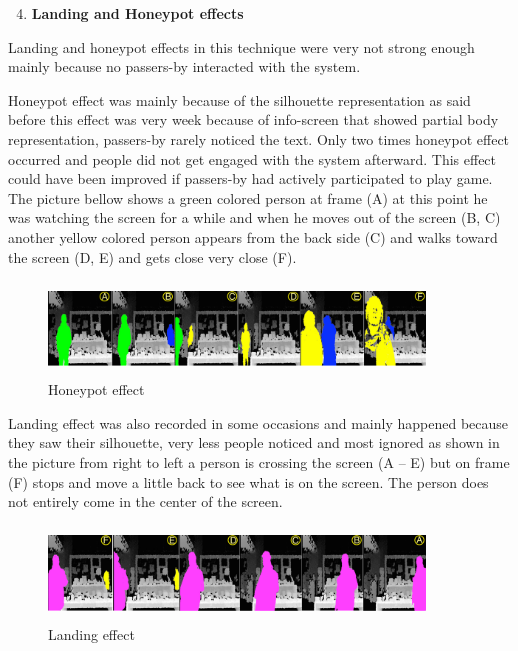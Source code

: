 \newpage

\begin{enumerate}
\setcounter{enumi}{3}

\item \textbf{Landing and Honeypot effects}
\end{enumerate}

Landing and honeypot effects in this technique were very not strong enough mainly because no passers-by interacted with the system.

Honeypot effect was mainly because of the silhouette representation as said before this effect was very week because of info-screen that showed partial body representation, passers-by rarely noticed the text. Only two times honeypot effect occurred and people did not get engaged with the system afterward. This effect could have been improved if passers-by had actively participated to play game.  The picture bellow shows a green colored person at frame (A) at this point he was watching the screen for a while and when he moves out of the screen (B, C) another yellow colored person appears from the back side (C) and walks toward the screen (D, E) and gets close very close (F).

\begin{figure}[H]
    \centering
    \includegraphics[width=100mm,height=25mm]{Figures/8/mobile_inter_findings/effects/honeypot}
    \caption{Honeypot effect}
    \label{fig:mobile_honeypoteffect}
\end{figure}


Landing effect was also recorded in some occasions and mainly happened because they saw their silhouette, very less people noticed and most ignored as shown in the picture from right to left a person is crossing the screen (A – E) but on frame (F) stops and move a little back to see what is on the screen. The person does not entirely come in the center of the screen.

\begin{figure}[H]
    \centering
    \includegraphics[width=100mm,height=25mm]{Figures/8/mobile_inter_findings/effects/landing}
    \caption{Landing effect}
    \label{fig:mobile_landingeffect}
\end{figure}




